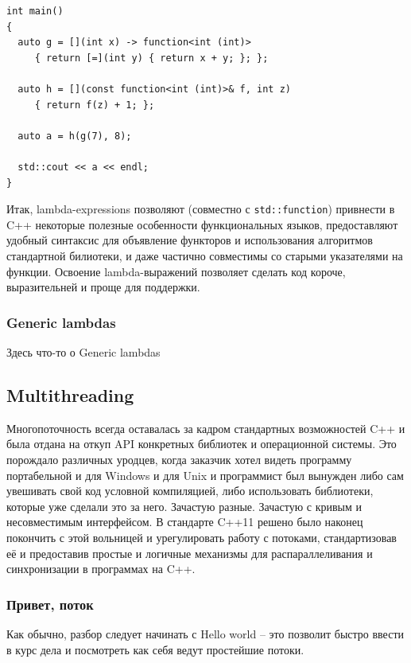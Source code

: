 \documentclass[a4paper,12pt,oneside]{article}
\begin{document}
\begin{lstlisting}
int main()
{
  auto g = [](int x) -> function<int (int)> 
     { return [=](int y) { return x + y; }; };

  auto h = [](const function<int (int)>& f, int z) 
     { return f(z) + 1; };

  auto a = h(g(7), 8);

  std::cout << a << endl;
}
\end{lstlisting}

Итак, lambda-expressions позволяют (совместно с \lstinline!std::function!) привнести в C++ некоторые полезные особенности функциональных языков, предоставляют удобный синтаксис для объявление функторов и использования алгоритмов стандартной билиотеки, и даже частично совместимы со старыми указателями на функции. Освоение lambda-выражений позволяет сделать код короче, выразительней и проще для поддержки.

\subsubsection{Generic lambdas}

Здесь что-то о Generic lambdas

\subsection{Multithreading}

Многопоточность всегда оставалась за кадром стандартных возможностей C++ и была отдана на откуп API конкретных библиотек и операционной системы. Это порождало различных уродцев, когда заказчик хотел видеть программу портабельной и для Windows и для Unix и программист был вынужден либо сам увешивать свой код условной компиляцией, либо использовать библиотеки, которые уже сделали это за него. Зачастую разные. Зачастую с кривым и несовместимым интерфейсом. В стандарте C++11 решено было наконец покончить с этой вольницей и урегулировать работу с потоками, стандартизовав её и предоставив простые и логичные механизмы для распараллеливания и синхронизации в программах на C++.

\subsubsection{Привет, поток}

Как обычно, разбор следует начинать с Hello world -- это позволит быстро ввести в курс дела и посмотреть как себя ведут простейшие потоки.
\end{document}
